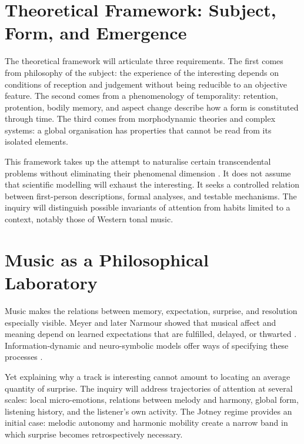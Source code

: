 \documentclass[11pt,a4paper]{article}
\begin{document}
\section{Theoretical Framework: Subject, Form, and Emergence}

The theoretical framework will articulate three requirements. The first comes
from philosophy of the subject: the experience of the interesting depends on
conditions of reception and judgement without being reducible to an objective
feature. The second comes from a phenomenology of temporality: retention,
protention, bodily memory, and aspect change describe how a form is constituted
through time. The third comes from morphodynamic theories and complex systems:
a global organisation has properties that cannot be read from its isolated
elements.

This framework takes up the attempt to naturalise certain transcendental
problems without eliminating their phenomenal dimension
\parencite{petitot1993phenomenologie,petitot2002naturaliser}. It does not assume
that scientific modelling will exhaust the interesting. It seeks a controlled
relation between first-person descriptions, formal analyses, and testable
mechanisms. The inquiry will distinguish possible invariants of attention from
habits limited to a context, notably those of Western tonal music.

\section{Music as a Philosophical Laboratory}

Music makes the relations between memory, expectation, surprise, and resolution
especially visible. Meyer and later Narmour showed that musical affect and
meaning depend on learned expectations that are fulfilled, delayed, or thwarted
\parencite{meyer1956emotion,narmour1990basic,narmour1992complexity}.
Information-dynamic and neuro-symbolic models offer ways of specifying these
processes \parencite{abdallah2009information,berger1999expectations,gang1999unified}.

Yet explaining why a track is interesting cannot amount to locating an average
quantity of surprise. The inquiry will address trajectories of attention at
several scales: local micro-emotions, relations between melody and harmony,
global form, listening history, and the listener's own activity. The Jotney
regime provides an initial case: melodic autonomy and harmonic mobility create a
narrow band in which surprise becomes retrospectively necessary.
\end{document}
